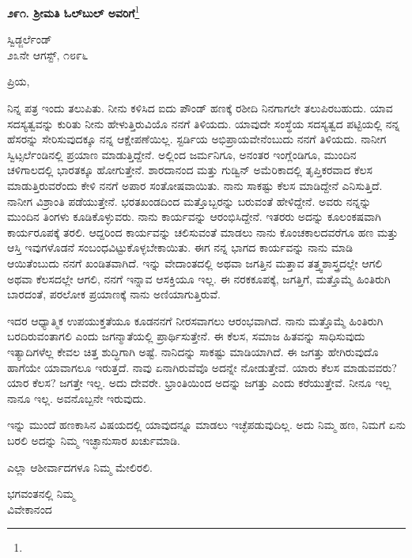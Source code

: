 \begin{center}
\textbf{೨೯೧. ಶ‍್ರೀಮತಿ ಓಲ್‌ಬುಲ್‌ ಅವರಿಗೆ}\footnote{}
\end{center}

\vspace{-0.5cm}

\begin{flushright}
ಸ್ವಿಡ್ಜರ್ಲೆಂಡ್\\೨೩ನೇ ಆಗಸ್ಟ್, ೧೮೯೬
\end{flushright}

\noindent
ಪ್ರಿಯ,

ನಿನ್ನ ಪತ್ರ ಇಂದು ತಲುಪಿತು. ನೀನು ಕಳಿಸಿದ ಐದು ಪೌಂಡ್ ಹಣಕ್ಕೆ ರಶೀದಿ ನಿನಗಾಗಲೇ ತಲುಪಿರಬಹುದು. ಯಾವ ಸದಸ್ಯತ್ವವನ್ನು ಕುರಿತು ನೀನು ಹೇಳುತ್ತಿರುವಿಯೊ ನನಗೆ ತಿಳಿಯದು. ಯಾವುದೇ ಸಂಸ್ಥೆಯ ಸದಸ್ಯತ್ವದ ಪಟ್ಟಿಯಲ್ಲಿ ನನ್ನ ಹೆಸರನ್ನು ಸೇರಿಸುವುದಕ್ಕೂ ನನ್ನ ಆಕ್ಷೇಪಣೆಯಿಲ್ಲ. ಸ್ಟರ್ಡಿಯ ಅಭಿಪ್ರಾಯವೇನೆಂಬುದು ನನಗೆ ತಿಳಿಯದು. ನಾನೀಗ ಸ್ವಿಟ್ಸರ್ಲೆಂಡಿನಲ್ಲಿ ಪ್ರಯಾಣ ಮಾಡುತ್ತಿದ್ದೇನೆ. ಅಲ್ಲಿಂದ ಜರ್ಮನಿಗೂ, ಅನಂತರ ಇಂಗ್ಲೆಂಡಿಗೂ, ಮುಂದಿನ ಚಳಿಗಾಲದಲ್ಲಿ ಭಾರತಕ್ಕೂ ಹೋಗುತ್ತೇನೆ. ಶಾರದಾನಂದ ಮತ್ತು ಗುಡ್ವಿನ್ ಅಮೆರಿಕಾದಲ್ಲಿ ತೃಪ್ತಿಕರವಾದ ಕೆಲಸ ಮಾಡುತ್ತಿರುವರೆಂದು ಕೇಳಿ ನನಗೆ ಅಪಾರ ಸಂತೋಷವಾಯಿತು. ನಾನು ಸಾಕಷ್ಟು ಕೆಲಸ ಮಾಡಿದ್ದೇನೆ ಎನಿಸುತ್ತಿದೆ. ನಾನೀಗ ವಿಶ್ರಾಂತಿ ಪಡೆಯುತ್ತೇನೆ. ಭರತಖಂಡದಿಂದ ಮತ್ತೊಬ್ಬರನ್ನು ಬರುವಂತೆ ಹೇಳಿದ್ದೇನೆ. ಅವರು ನನ್ನನ್ನು ಮುಂದಿನ ತಿಂಗಳು ಕೂಡಿಕೊಳ್ಳುವರು. ನಾನು ಕಾರ್ಯವನ್ನು ಆರಂಭಿಸಿದ್ದೇನೆ. ಇತರರು ಅದನ್ನು ಕೂಲಂಕಷವಾಗಿ ಕಾರ್ಯರೂಪಕ್ಕೆ ತರಲಿ. ಆದ್ದರಿಂದ ಕಾರ್ಯವನ್ನು ಚಲಿಸುವಂತೆ ಮಾಡಲು ನಾನು ಕೊಂಚಕಾಲದವರೆಗೂ ಹಣ ಮತ್ತು ಆಸ್ತಿ ಇವುಗಳೊಡನೆ ಸಂಬಂಧವಿಟ್ಟುಕೊಳ್ಳಬೇಕಾಯಿತು. ಈಗ ನನ್ನ ಭಾಗದ ಕಾರ್ಯವನ್ನು ನಾನು ಮಾಡಿ ಆಯಿತೆಂಬುದು ನನಗೆ ಖಂಡಿತವಾಗಿದೆ. ಇನ್ನು ವೇದಾಂತದಲ್ಲಿ ಅಥವಾ ಜಗತ್ತಿನ ಮತ್ತಾವ ತತ್ತ್ವಶಾಸ್ತ್ರದಲ್ಲೇ ಆಗಲಿ ಅಥವಾ ಕೆಲಸದಲ್ಲೇ ಆಗಲಿ, ನನಗೆ ಇನ್ನಾವ ಆಸಕ್ತಿಯೂ ಇಲ್ಲ. ಈ ನರಕಕೂಪಕ್ಕೆ, ಜಗತ್ತಿಗೆ, ಮತ್ತೊಮ್ಮೆ ಹಿಂತಿರುಗಿ ಬಾರದಂತೆ, ಪರಲೋಕ ಪ್ರಯಾಣಕ್ಕೆ ನಾನು ಅಣಿಯಾಗುತ್ತಿರುವೆ.

ಇದರ ಆಧ್ಯಾತ್ಮಿಕ ಉಪಯುಕ್ತತೆಯೂ ಕೂಡನನಗೆ ನೀರಸವಾಗಲು ಆರಂಭವಾಗಿದೆ. ನಾನು ಮತ್ತೊಮ್ಮೆ ಹಿಂತಿರುಗಿ ಬರದಿರುವಂತಾಗಲಿ ಎಂದು ಜಗನ್ಮಾತೆಯಲ್ಲಿ ಪ್ರಾರ್ಥಿಸುತ್ತೇನೆ. ಈ ಕೆಲಸ, ಸಮಾಜ ಹಿತವನ್ನು ಸಾಧಿಸುವುದು ಇತ್ಯಾದಿಗಳೆಲ್ಲ ಕೇವಲ ಚಿತ್ತ ಶುದ್ಧಿಗಾಗಿ ಅಷ್ಟೆ. ನಾನಿದನ್ನು ಸಾಕಷ್ಟು ಮಾಡಿಯಾಗಿದೆ. ಈ ಜಗತ್ತು ಹೇಗಿರುವುದೊ ಹಾಗೆಯೇ ಯಾವಾಗಲೂ ಇರುತ್ತದೆ. ನಾವು ಏನಾಗಿರುವೆವೊ ಅದನ್ನೇ ನೋಡುತ್ತೇವೆ. ಯಾರು ಕೆಲಸ ಮಾಡುವವರು? ಯಾರ ಕೆಲಸ? ಜಗತ್ತೇ ಇಲ್ಲ. ಅದು ದೇವರೇ. ಭ್ರಾಂತಿಯಿಂದ ಅದನ್ನು ಜಗತ್ತು ಎಂದು ಕರೆಯುತ್ತೇವೆ. ನೀನೂ ಇಲ್ಲ ನಾನೂ ಇಲ್ಲ. ಅವನೊಬ್ಬನೇ ಇರುವುದು.

ಇನ್ನು ಮುಂದೆ ಹಣಕಾಸಿನ ವಿಷಯದಲ್ಲಿ ಯಾವುದನ್ನೂ ಮಾಡಲು ಇಚ್ಛೆಪಡುವುದಿಲ್ಲ. ಅದು ನಿಮ್ಮ ಹಣ, ನಿಮಗೆ ಏನು ಬರಲಿ ಅದನ್ನು ನಿಮ್ಮ ಇಚ್ಛಾನುಸಾರ ಖರ್ಚುಮಾಡಿ.

ಎಲ್ಲಾ ಆಶೀರ್ವಾದಗಳೂ ನಿಮ್ಮ ಮೇಲಿರಲಿ.

\begin{flushright}
ಭಗವಂತನಲ್ಲಿ ನಿಮ್ಮ\\ವಿವೇಕಾನಂದ
\end{flushright}

